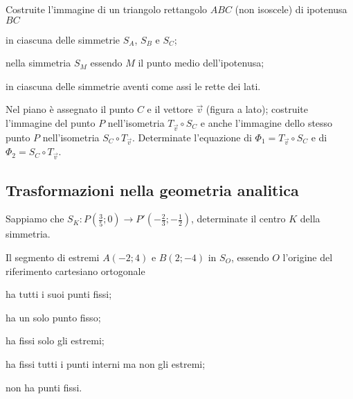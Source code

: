 \begin{esercizio}
\label{ese:8.96} %
Costruite l'immagine di un triangolo rettangolo $ABC$ (non isoscele) 
di ipotenusa $BC$
\begin{enumeratea}
\item in ciascuna delle simmetrie $S_A$, $S_B$ e $S_C$;
\item nella simmetria $S_M$ essendo $M$ il punto medio dell'ipotenusa;
\item in ciascuna delle simmetrie aventi come assi le rette dei lati.
\end{enumeratea}
\end{esercizio}

\begin{esercizio}
  \label{ese:8.63} %
  Nel piano è assegnato il punto $C$ e il vettore $\vec{v}$ (figura a 
  lato); costruite l'immagine del punto $P$ nell'isometria $T_{\vec{v}} 
  \circ S_{C}$ e anche l'immagine dello stesso punto $P$ nell'isometria 
  $S_{C} \circ T_{\vec{v}}$. Determinate l'equazione di $\Phi_1 = 
  T_{\vec{v}} \circ S_{C}$ e di $\Phi_2 = S_{C} \circ T_{\vec{v}}$.
\end{esercizio}


\subsection{Trasformazioni nella geometria analitica}

\begin{esercizio}
  \label{ese:8.7}
  Sappiamo che $S_K:P\left(\frac{3}{5};0\right) \rightarrow 
  P'\left(-\frac{2}{3};-\frac{1}{2}\right)$, determinate il centro $K$ 
  della simmetria. 
\end{esercizio}

\begin{esercizio}
  \label{ese:8.8}
  Il segmento di estremi $A(-2;4)$ e $B(2;-4)$ in $S_O$, essendo $O$ 
  l'origine del riferimento cartesiano ortogonale
  \begin{enumeratea}
    \item ha tutti i suoi punti fissi;
    \item ha un solo punto fisso;
    \item ha fissi solo gli estremi;
    \item ha fissi tutti i punti interni ma non gli estremi;
    \item non ha punti fissi.
  \end{enumeratea}
\end{esercizio}

